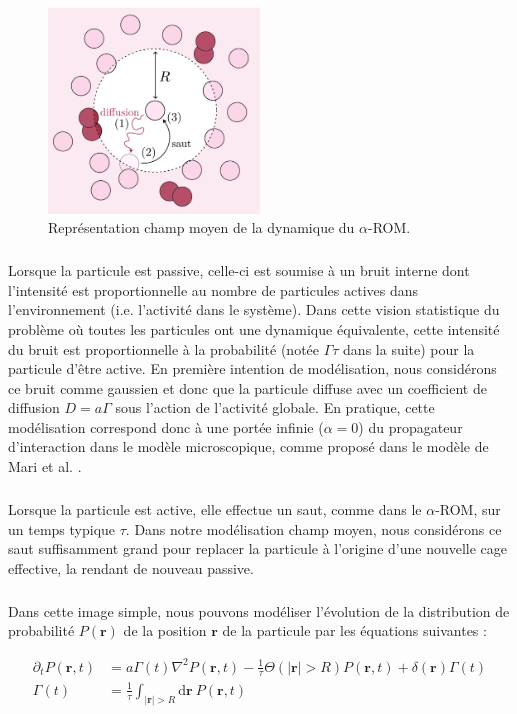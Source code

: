 \begin{figure}[h]
	\centering
	\includegraphics[width=0.5\textwidth]{Chapitre3/Figures/Interpretation/LHLModel.pdf}
	\caption{Représentation champ moyen de la dynamique du $\alpha$-ROM.}
	\label{fig:LHLmodel}
\end{figure}

\subparagraph{}Lorsque la particule est passive, celle-ci est soumise à un bruit interne dont l'intensité est proportionnelle au nombre de particules actives dans l'environnement (i.e. l'activité dans le système). Dans cette vision statistique du problème où toutes les particules ont une dynamique équivalente, cette intensité du bruit est proportionnelle à la probabilité (notée $\Gamma\tau$ dans la suite) pour la particule d'être active. En première intention de modélisation, nous considérons ce bruit comme gaussien et donc que la particule diffuse avec un coefficient de diffusion $D=a\Gamma$ sous l'action de l'activité globale. En pratique, cette modélisation correspond donc à une portée infinie ($\alpha = 0$) du propagateur d'interaction dans le modèle microscopique, comme proposé dans le modèle de Mari et al. \cite{mari_absorbing_2022}.

\subparagraph{}Lorsque la particule est active, elle effectue un saut, comme dans le $\alpha$-ROM, sur un temps typique $\tau$. Dans notre modélisation champ moyen, nous considérons ce saut suffisamment grand pour replacer la particule à l'origine d'une nouvelle cage effective, la rendant de nouveau passive. 

\subparagraph{}Dans cette image simple, nous pouvons modéliser l'évolution de la distribution de probabilité $P(\mathbf{r})$ de la position $\mathbf{r}$ de la particule par les équations suivantes :

\begin{equation}
\begin{aligned}
    \partial_t P(\mathbf{r}, t) &= a\Gamma (t)\nabla^2 P(\mathbf{r}, t) - \frac{1}{\tau}\Theta(|\mathbf{r}|>R)P(\mathbf{r}, t) + \delta(\mathbf{r})\Gamma (t)\\ \Gamma (t) &= \frac{1}{\tau}\int_{|\mathbf{r}|>R}\mathrm{d}\mathbf{r}~P(\mathbf{r}, t)
    \label{eq:muHLDiff}
\end{aligned}
\end{equation} 

